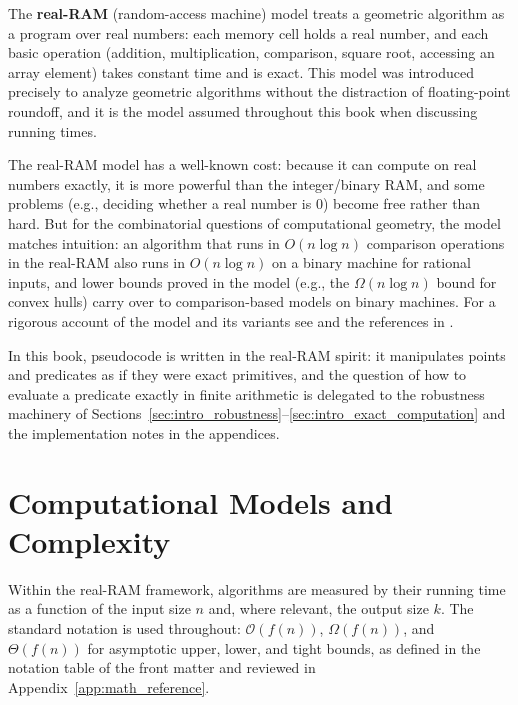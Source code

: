 The \textbf{real-RAM} (random-access machine) model treats a geometric
algorithm as a program over real numbers: each memory cell holds a real
number, and each basic operation (addition, multiplication, comparison,
square root, accessing an array element) takes constant time and is
exact. This model was introduced precisely to analyze geometric algorithms
without the distraction of floating-point roundoff, and it is the model
assumed throughout this book when discussing running times.

The real-RAM model has a well-known cost: because it can compute on real
numbers exactly, it is more powerful than the integer/binary RAM, and some
problems (e.g., deciding whether a real number is $0$) become free rather
than hard. But for the combinatorial questions of computational geometry,
the model matches intuition: an algorithm that runs in $O(n\log n)$
comparison operations in the real-RAM also runs in $O(n\log n)$ on a
binary machine for rational inputs, and lower bounds proved in the
model (e.g., the $\Omega(n\log n)$ bound for convex hulls) carry over to
comparison-based models on binary machines. For a rigorous account of the
model and its variants see \cite{deberg2008} and the references in
\cite{preparata1985}.

In this book, pseudocode is written in the real-RAM spirit: it manipulates
points and predicates as if they were exact primitives, and the question of
how to evaluate a predicate exactly in finite arithmetic is delegated to
the robustness machinery of Sections~\ref{sec:intro_robustness}--\ref{sec:intro_exact_computation}
and the implementation notes in the appendices.


\section{Computational Models and Complexity}
\label{sec:intro_models_complexity}

Within the real-RAM framework, algorithms are measured by their running
time as a function of the input size $n$ and, where relevant, the output
size $k$. The standard notation is used throughout: $\mathcal{O}(f(n))$,
$\Omega(f(n))$, and $\Theta(f(n))$ for asymptotic upper, lower, and tight
bounds, as defined in the notation table of the front matter and reviewed in
Appendix~\ref{app:math_reference}.

